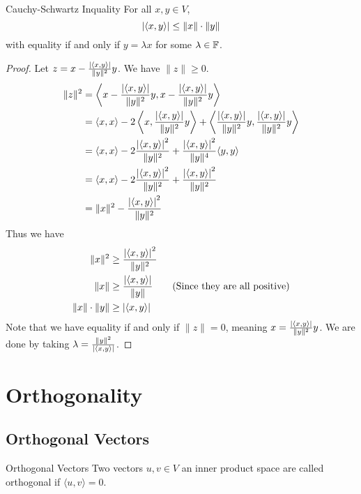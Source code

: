 \documentclass[a4paper]{article}
\begin{document}
\begin{prp}{Cauchy-Schwartz Inquality}{} For all $x,y\in V$, $$\abs{\langle x,y\rangle}\leq\|x\|\cdot\|y\|$$ with equality if and only if $y=\lambda x$ for some $\lambda\in\mathbb{F}$. 
\begin{proof} Let $z=x-\frac{\abs{\langle x,y\rangle}}{\|y\|^2}y$. We have $\|z\|\geq0$. 
\begin{align*}
\|z\|^2&=\left\langle x-\frac{\abs{\langle x,y\rangle}}{\|y\|^2}y,x-\frac{\abs{\langle x,y\rangle}}{\|y\|^2}y\right\rangle\\
&=\langle x,x\rangle-2\left\langle x,\frac{\abs{\langle x,y\rangle}}{\|y\|^2}y\right\rangle+\left\langle \frac{\abs{\langle x,y\rangle}}{\|y\|^2}y,\frac{\abs{\langle x,y\rangle}}{\|y\|^2}y\right\rangle\\
&=\langle x,x\rangle-2\frac{\abs{\langle x,y\rangle}^2}{\|y\|^2}+\frac{\abs{\langle x,y\rangle}^2}{\|y\|^4}\langle y,y\rangle\\
&=\langle x,x\rangle-2\frac{\abs{\langle x,y\rangle}^2}{\|y\|^2}+\frac{\abs{\langle x,y\rangle}^2}{\|y\|^2}\\
&=\|x\|^2-\frac{\abs{\langle x,y\rangle}^2}{\|y\|^2}\\
\end{align*}
Thus we have
\begin{align*}
\|x\|^2&\geq\frac{\abs{\langle x,y\rangle}^2}{\|y\|^2}\\
\|x\|&\geq\frac{\abs{\langle x,y\rangle}}{\|y\|}\tag{Since they are all positive}\\
\|x\|\cdot\|y\|&\geq\abs{\langle x,y\rangle}
\end{align*}
Note that we have equality if and only if $\|z\|=0$, meaning $x=\frac{\abs{\langle x,y\rangle}}{\|y\|^2}y$. We are done by taking $\lambda=\frac{\|y\|^2}{\abs{\langle x,y\rangle}}$. 
\end{proof}
\end{prp}

\pagebreak
\section{Orthogonality}
\subsection{Orthogonal Vectors}
\begin{defn}{Orthogonal Vectors}{} Two vectors $u,v\in V$ an inner product space are called orthogonal if $\langle u,v\rangle=0$. 
\end{defn}
\end{document}
